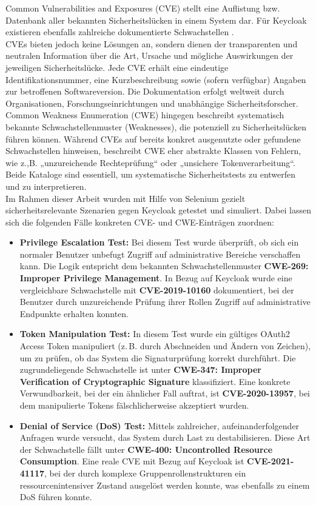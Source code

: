 \documentclass[a4paper,12pt]{article}
\let\footnote=\endnote
\begin{document}
	Common Vulnerabilities and Exposures (CVE) stellt eine Auflistung bzw. Datenbank aller bekannten Sicherheitslücken in einem System dar. Für Keycloak existieren ebenfalls zahlreiche dokumentierte Schwachstellen \footnote{\url{https://cve.mitre.org/cgi-bin/cvekey.cgi?keyword=keycloak}}.
	\\[0.5em]
	CVEs bieten jedoch keine Lösungen an, sondern dienen der transparenten und neutralen Information über die Art, Ursache und mögliche Auswirkungen der jeweiligen Sicherheitslücke. Jede CVE erhält eine eindeutige Identifikationsnummer, eine Kurzbeschreibung sowie (sofern verfügbar) Angaben zur betroffenen Softwareversion. Die Dokumentation erfolgt weltweit durch Organisationen, Forschungseinrichtungen und unabhängige Sicherheitsforscher.
	\\[0.5em]
	Common Weakness Enumeration (CWE) hingegen beschreibt systematisch bekannte Schwachstellenmuster (Weaknesses), die potenziell zu Sicherheitslücken führen können. Während CVEs auf bereits konkret ausgenutzte oder gefundene Schwachstellen hinweisen, beschreibt CWE eher abstrakte Klassen von Fehlern, wie z.,B. „unzureichende Rechteprüfung“ oder „unsichere Tokenverarbeitung“. Beide Kataloge sind essentiell, um systematische Sicherheitstests zu entwerfen und zu interpretieren.
	\\[0.5em]
	Im Rahmen dieser Arbeit wurden mit Hilfe von Selenium gezielt sicherheitsrelevante Szenarien gegen Keycloak getestet und simuliert. Dabei lassen sich die folgenden Fälle konkreten CVE- und CWE-Einträgen zuordnen:

	\begin{itemize}
		\item \textbf{Privilege Escalation Test:}
		Bei diesem Test wurde überprüft, ob sich ein normaler Benutzer unbefugt Zugriff auf administrative Bereiche verschaffen kann. Die Logik entspricht dem bekannten Schwachstellenmuster \textbf{CWE-269: Improper Privilege Management}. In Bezug auf Keycloak wurde eine vergleichbare Schwachstelle mit \textbf{CVE-2019-10160} dokumentiert, bei der Benutzer durch unzureichende Prüfung ihrer Rollen Zugriff auf administrative Endpunkte erhalten konnten.
		\item \textbf{Token Manipulation Test:}  
		In diesem Test wurde ein gültiges OAuth2 Access Token manipuliert (z.\,B. durch Abschneiden und Ändern von Zeichen), um zu prüfen, ob das System die Signaturprüfung korrekt durchführt. Die zugrundeliegende Schwachstelle ist unter \textbf{CWE-347: Improper Verification of Cryptographic Signature} klassifiziert. Eine konkrete Verwundbarkeit, bei der ein ähnlicher Fall auftrat, ist \textbf{CVE-2020-13957}, bei dem manipulierte Tokens fälschlicherweise akzeptiert wurden.
		\item \textbf{Denial of Service (DoS) Test:}  
		Mittels zahlreicher, aufeinanderfolgender Anfragen wurde versucht, das System durch Last zu destabilisieren. Diese Art der Schwachstelle fällt unter \textbf{CWE-400: Uncontrolled Resource Consumption}. Eine reale CVE mit Bezug auf Keycloak ist \textbf{CVE-2021-41117}, bei der durch komplexe Gruppenrollenstrukturen ein ressourcenintensiver Zustand ausgelöst werden konnte, was ebenfalls zu einem DoS führen konnte.
	\end{itemize}
\end{document}
